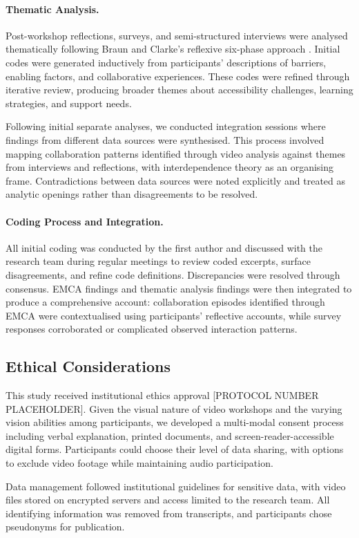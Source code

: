 \paragraph{Thematic Analysis.}
Post-workshop reflections, surveys, and semi-structured interviews were analysed thematically following Braun and Clarke's reflexive six-phase approach \cite{braun_reflecting_2019}. Initial codes were generated inductively from participants' descriptions of barriers, enabling factors, and collaborative experiences. These codes were refined through iterative review, producing broader themes about accessibility challenges, learning strategies, and support needs.

Following initial separate analyses, we conducted integration sessions where findings from different data sources were synthesised. This process involved mapping collaboration patterns identified through video analysis against themes from interviews and reflections, with interdependence theory as an organising frame. Contradictions between data sources were noted explicitly and treated as analytic openings rather than disagreements to be resolved.

\paragraph{Coding Process and Integration.}
All initial coding was conducted by the first author and discussed with the research team during regular meetings to review coded excerpts, surface disagreements, and refine code definitions. Discrepancies were resolved through consensus. EMCA findings and thematic analysis findings were then integrated to produce a comprehensive account: collaboration episodes identified through EMCA were contextualised using participants' reflective accounts, while survey responses corroborated or complicated observed interaction patterns.

\subsection{Ethical Considerations}
This study received institutional ethics approval [PROTOCOL NUMBER PLACEHOLDER]. Given the visual nature of video workshops and the varying vision abilities among participants, we developed a multi-modal consent process including verbal explanation, printed documents, and screen-reader-accessible digital forms. Participants could choose their level of data sharing, with options to exclude video footage while maintaining audio participation.

Data management followed institutional guidelines for sensitive data, with video files stored on encrypted servers and access limited to the research team. All identifying information was removed from transcripts, and participants chose pseudonyms for publication.

